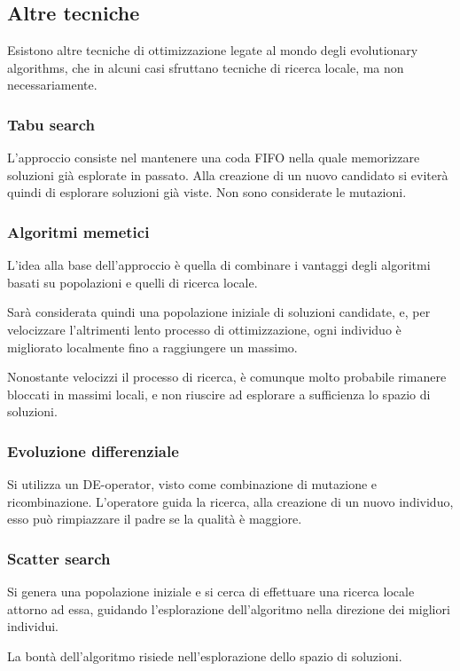 \documentclass[a4paper]{article}
\begin{document}
\subsection{Altre tecniche}
Esistono altre tecniche di ottimizzazione legate al mondo degli 
evolutionary algorithms, che in alcuni casi sfruttano tecniche di ricerca locale, 
ma non necessariamente.

\subsubsection{Tabu search}
L'approccio consiste nel mantenere una coda FIFO nella quale memorizzare 
soluzioni già esplorate in passato.
Alla creazione di un nuovo candidato si eviterà quindi di esplorare soluzioni già viste.
Non sono considerate le mutazioni.

\subsubsection{Algoritmi memetici}
L'idea alla base dell'approccio è quella di combinare i vantaggi degli algoritmi 
basati su popolazioni e quelli di ricerca locale.

Sarà considerata quindi una popolazione iniziale di soluzioni candidate, e, per
velocizzare l'altrimenti lento processo di ottimizzazione, ogni individuo è migliorato 
localmente fino a raggiungere un massimo.

Nonostante velocizzi il processo di ricerca, è comunque molto probabile rimanere bloccati 
in massimi locali, e non riuscire ad esplorare a sufficienza lo spazio di soluzioni.

\subsubsection{Evoluzione differenziale}
Si utilizza un DE-operator, visto come combinazione di mutazione e ricombinazione.
L'operatore guida la ricerca, alla creazione di un nuovo individuo, esso può rimpiazzare
il padre se la qualità è maggiore.

\subsubsection{Scatter search}
Si genera una popolazione iniziale e si cerca di effettuare una ricerca locale attorno ad 
essa, guidando l'esplorazione dell'algoritmo nella direzione dei migliori individui.

La bontà dell'algoritmo risiede nell'esplorazione dello spazio di soluzioni.
\end{document}
